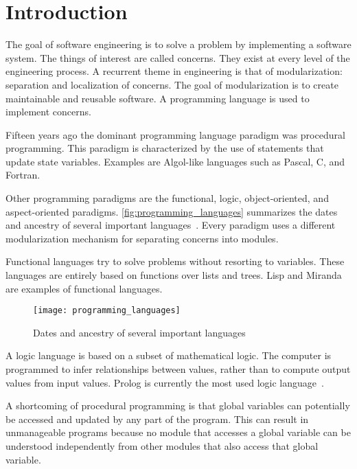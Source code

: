 \section{Introduction}
%
%

The goal of software engineering is to solve a problem by implementing a software system.
The things of interest are called concerns.
They exist at every level of the engineering process.
A recurrent theme in engineering is that of modularization: separation and localization of concerns.
The goal of modularization is to create maintainable and reusable software.
A programming language is used to implement concerns.

Fifteen years ago the dominant programming language paradigm was procedural programming.
This paradigm is characterized by the use of statements that update state variables.
Examples are Algol-like languages such as Pascal, C, and Fortran.

Other programming paradigms are the functional, logic, object-oriented, and aspect-oriented paradigms.
\autoref{fig:programming_languages} summarizes the dates and ancestry of several important languages~\cite{Watt90}.
Every paradigm uses a different modularization mechanism for separating concerns into modules.

Functional languages try to solve problems without resorting to variables.
These languages are entirely based on functions over lists and trees.
Lisp and Miranda are examples of functional languages.

\begin{figure}
  \centering
  \texttt{[image: programming\_languages]}
  \caption{Dates and ancestry of several important languages}
  \label{fig:programming_languages}
\end{figure}

A logic language is based on a subset of mathematical logic.
The computer is programmed to infer relationships between values, rather than to compute output values from input values.
Prolog is currently the most used logic language~\cite{Watt90}.

A shortcoming of procedural programming is that global variables can potentially be accessed and updated by any part of the program.
This can result in unmanageable programs because no module that accesses a global variable can be understood independently from other modules that also access that global variable.

